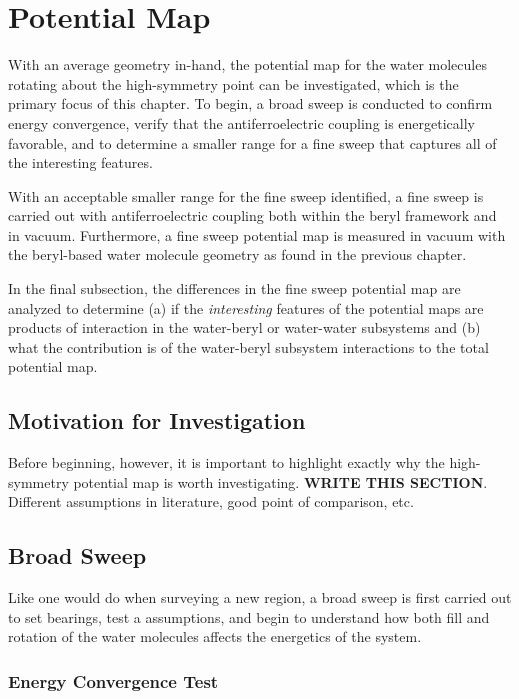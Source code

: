 \chapter{Potential Map}

With an average geometry in-hand, the potential map for the water molecules rotating about the high-symmetry point can be investigated, which is the primary focus of this chapter. To begin, a broad sweep is conducted to confirm energy convergence, verify that the antiferroelectric coupling is energetically favorable, and to determine a smaller range for a fine sweep that captures all of the interesting features. 

With an acceptable smaller range for the fine sweep identified, a fine sweep is carried out with antiferroelectric coupling both within the beryl framework and in vacuum. Furthermore, a fine sweep potential map is measured in vacuum with the beryl-based water molecule geometry as found in the previous chapter. 

In the final subsection, the differences in the fine sweep potential map are analyzed to determine (a) if the \textit{interesting} features of the potential maps are products of interaction in the water-beryl or water-water subsystems and (b) what the contribution is of the water-beryl subsystem interactions to the total potential map.

    \section{Motivation for Investigation}
    Before beginning, however, it is important to highlight exactly why the high-symmetry potential map is worth investigating.
    \textbf{WRITE THIS SECTION}. Different assumptions in literature, good point of comparison, etc.

    \section{Broad Sweep}
    Like one would do when surveying a new region, a broad sweep is first carried out to set bearings, test a assumptions, and begin to understand how both fill and rotation of the water molecules affects the energetics of the system. 
        \subsection{Energy Convergence Test}
        \label{sec:en_conv_test}
